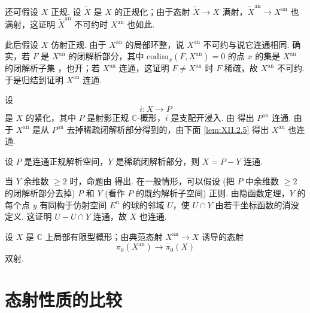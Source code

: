 还可假设 $X$ 正规. 设 $\widetilde{X}$ 是 $X$ 的正规化；由于态射 $\widetilde{X} \to X$ 满射，$\widetilde{X}^{\mathrm{an}} \to X^{\mathrm{an}}$ 也满射，这证明 $\widetilde{X}^{\mathrm{an}}$ 不可约时 $X^{\mathrm{an}}$ 也如此.

此后假设 $X$ 仿射正规. 由于 $X^{\mathrm{an}}$ 的局部环整，说 $X^{\mathrm{an}}$ 不可约与说它连通相同. 确实，若 $F$ 是 $X^{\mathrm{an}}$ 的闭解析部分，其中 $\mathrm{codim}_x(F, X^{\mathrm{an}}) = 0$ 的点 $x$ 的集是 $X^{\mathrm{an}}$ 的闭解析子集 \cite[第 20 号 A 推论 1]{exp12-4}，也开；若 $X^{\mathrm{an}}$ 连通，这证明 $F \neq X^{\mathrm{an}}$ 时 $F$ 稀疏，故 $X^{\mathrm{an}}$ 不可约. 于是归结到证明 $X^{\mathrm{an}}$ 连通.

设
\[
i \colon X \longrightarrow P
\]
是 $X$ 的紧化，其中 $P$ 是射影正规 $\mathbb{C}$-概形，$i$ 是支配开浸入. 由 \cite[第 12 号 定理 1]{exp12-10} 得出 $P^{\mathrm{an}}$ 连通. 由于 $X^{\mathrm{an}}$ 是从 $P^{\mathrm{an}}$ 去掉稀疏闭解析部分得到的，由下面 \ref{lem:XII.2.5} 得出 $X^{\mathrm{an}}$ 也连通.

\begin{lemma}\label{lem:XII.2.5}
设 $P$ 是连通正规解析空间，$Y$ 是稀疏闭解析部分，则 $X = P - Y$ 连通.
\end{lemma}

当 $Y$ 余维数 $\geqslant 2$ 时，命题由 \cite[第 3 号 命题 4]{exp12-11} 得出. 在一般情形，可以假设 (把 $P$ 中余维数 $\geqslant 2$ 的闭解析部分去掉) $P$ 和 $Y$ (看作 $P$ 的既约解析子空间) 正则. 由隐函数定理，$Y$ 的每个点 $y$ 有同构于仿射空间 $E^n$ 的球的邻域 $U$，使 $U \cap Y$ 由若干坐标函数的消没定义. 这证明 $U - U \cap Y$ 连通，故 $X$ 也连通.

\begin{corollary}\label{cor:XII.2.6}
设 $X$ 是 $\mathbb{C}$ 上局部有限型概形；由典范态射 $X^{\mathrm{an}} \to X$ 诱导的态射
\[
\pi_0(X^{\mathrm{an}}) \longrightarrow \pi_0(X)
\]
双射.
\end{corollary}

\section{态射性质的比较}

